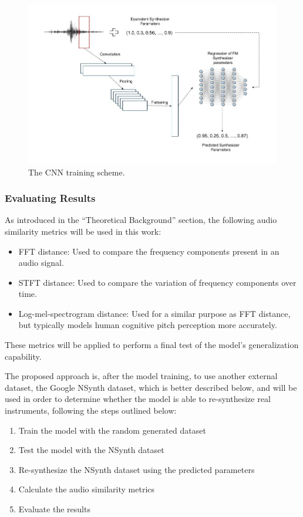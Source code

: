 \documentclass[sigconf,natbib=false]{acmart}
\begin{document}
\begin{figure}[h]
 \centering
 \includegraphics[width=\linewidth]{figs/cnn_simple_training.jpg}
 \caption{The CNN training scheme.}
\end{figure}

\subsubsection{Evaluating Results}

As introduced in the ``Theoretical Background'' section, the following audio similarity metrics will be used in this work:

\begin{itemize}
\item FFT distance: Used to compare the frequency components present in an audio signal.
\item STFT distance: Used to compare the variation of frequency components over time.
\item Log-mel-spectrogram distance: Used for a similar purpose as FFT distance, but typically models human cognitive pitch perception more accurately.
\end{itemize}

These metrics will be applied to perform a final test of the model's generalization capability.

The proposed approach is, after the model training, to use another external dataset, the Google NSynth dataset, which is better described below, and will be used in order to determine whether the model is able to re-synthesize real instruments, following the steps outlined below:

\begin{enumerate}
\item Train the model with the random generated dataset
\item Test the model with the NSynth dataset
\item Re-synthesize the NSynth dataset using the predicted parameters
\item Calculate the audio similarity metrics
\item Evaluate the results
\end{enumerate}
\end{document}

